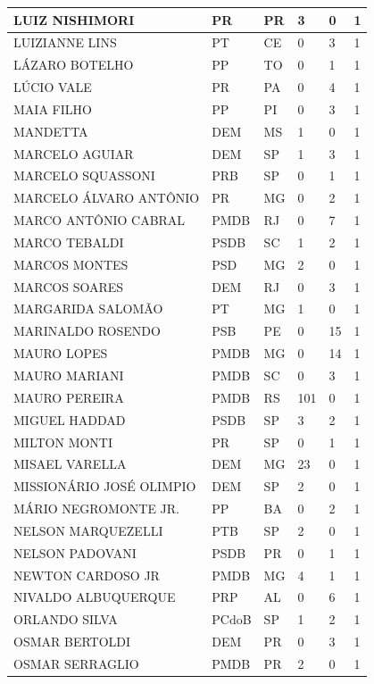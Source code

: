 \begin{apendicesenv}
\begin{longtable}{|L{4cm}|C{2cm}|C{1cm}|C{2cm}|C{1cm}|C{2cm}|}
LUIZ NISHIMORI & PR & PR & 3 & 0 & 1 \\ \hline
LUIZIANNE LINS & PT & CE & 0 & 3 & 1 \\ \hline
LÁZARO BOTELHO & PP & TO & 0 & 1 & 1 \\ \hline
LÚCIO VALE & PR & PA & 0 & 4 & 1 \\ \hline
MAIA FILHO & PP & PI & 0 & 3 & 1 \\ \hline
MANDETTA & DEM & MS & 1 & 0 & 1 \\ \hline
MARCELO AGUIAR & DEM & SP & 1 & 3 & 1 \\ \hline
MARCELO SQUASSONI & PRB & SP & 0 & 1 & 1 \\ \hline
MARCELO ÁLVARO ANTÔNIO & PR & MG & 0 & 2 & 1 \\ \hline
MARCO ANTÔNIO CABRAL & PMDB & RJ & 0 & 7 & 1 \\ \hline
MARCO TEBALDI & PSDB & SC & 1 & 2 & 1 \\ \hline
MARCOS MONTES & PSD & MG & 2 & 0 & 1 \\ \hline
MARCOS SOARES & DEM & RJ & 0 & 3 & 1 \\ \hline
MARGARIDA SALOMÃO & PT & MG & 1 & 0 & 1 \\ \hline
MARINALDO ROSENDO & PSB & PE & 0 & 15 & 1 \\ \hline
MAURO LOPES & PMDB & MG & 0 & 14 & 1 \\ \hline
MAURO MARIANI & PMDB & SC & 0 & 3 & 1 \\ \hline
MAURO PEREIRA & PMDB & RS & 101 & 0 & 1 \\ \hline
MIGUEL HADDAD & PSDB & SP & 3 & 2 & 1 \\ \hline
MILTON MONTI & PR & SP & 0 & 1 & 1 \\ \hline
MISAEL VARELLA & DEM & MG & 23 & 0 & 1 \\ \hline
MISSIONÁRIO JOSÉ OLIMPIO & DEM & SP & 2 & 0 & 1 \\ \hline
MÁRIO NEGROMONTE JR. & PP & BA & 0 & 2 & 1 \\ \hline
NELSON MARQUEZELLI & PTB & SP & 2 & 0 & 1 \\ \hline
NELSON PADOVANI & PSDB & PR & 0 & 1 & 1 \\ \hline
NEWTON CARDOSO JR & PMDB & MG & 4 & 1 & 1 \\ \hline
NIVALDO ALBUQUERQUE & PRP & AL & 0 & 6 & 1 \\ \hline
ORLANDO SILVA & PCdoB & SP & 1 & 2 & 1 \\ \hline
OSMAR BERTOLDI & DEM & PR & 0 & 3 & 1 \\ \hline
OSMAR SERRAGLIO & PMDB & PR & 2 & 0 & 1 \\ \hline

\end{longtable}
\end{apendicesenv}
